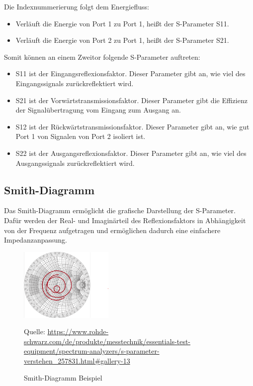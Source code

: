 Die Indexnummerierung folgt dem Energiefluss:

\begin{itemize}
    \item Verläuft die Energie von Port 1 zu Port 1, heißt der S-Parameter S11.
    \item Verläuft die Energie von Port 2 zu Port 1, heißt der S-Parameter S21.
\end{itemize}
Somit können an einem Zweitor folgende S-Parameter auftreten:
\begin{itemize}
    \item S11 ist der Eingangsreflexionsfaktor. Dieser Parameter gibt an, wie viel des Eingangssignals zurückreflektiert wird.
    \item S21 ist der Vorwärtstransmissionsfaktor. Dieser Parameter gibt die Effizienz der Signalübertragung vom Eingang zum Ausgang an.
    \item S12 ist der Rückwärtstransmissionsfaktor. Dieser Parameter gibt an, wie gut Port 1 von Signalen von Port 2 isoliert ist.
    \item S22 ist der Ausgangsreflexionsfaktor. Dieser Parameter gibt an, wie viel des Ausgangssignals zurückreflektiert wird.
\end{itemize}

\subsection{Smith-Diagramm}
Das Smith-Diagramm ermöglicht die grafische Darstellung der S-Parameter.
Dafür werden der Real- und Imaginärteil des Reflexionsfaktors in Abhängigkeit von der Frequenz
aufgetragen und ermöglichen dadurch eine einfachere Impedanzanpassung.
\begin{figure}[H]
    \centering
    \includegraphics[width=0.4\textwidth]{Pictures/SmithDiagram.png}
    \caption{Smith-Diagramm Beispiel}
    \footnotesize{Quelle: \url{https://www.rohde-schwarz.com/de/produkte/messtechnik/essentials-test-equipment/spectrum-analyzers/s-parameter-verstehen_257831.html#gallery-13}}
\end{figure}

\clearpage